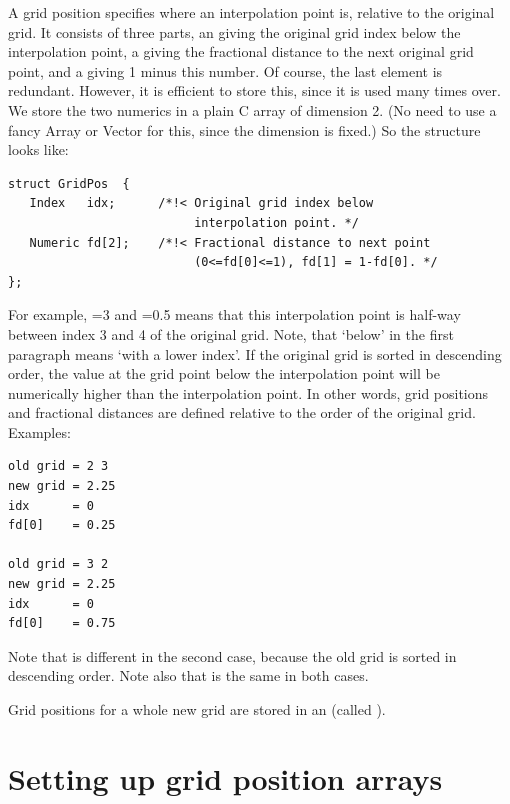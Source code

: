 A grid position specifies where an interpolation point is, relative
to the original grid. It consists of three parts, an  giving the
original grid index below the interpolation point, a 
giving the fractional distance to the next original grid point, and a
 giving 1 minus this number. Of course, the last element is
redundant. However, it is efficient to store this, since it is used
many times over. We store the two numerics in a plain C array of
dimension 2. (No need to use a fancy Array or Vector for this, since
the dimension is fixed.) So the structure  looks like:

\begin{verbatim}
struct GridPos  {
   Index   idx;      /*!< Original grid index below
                          interpolation point. */
   Numeric fd[2];    /*!< Fractional distance to next point
                          (0<=fd[0]<=1), fd[1] = 1-fd[0]. */ 
};
\end{verbatim}

For example, =3 and =0.5 means that this interpolation point is
half-way between index 3 and 4 of the original grid.  Note, that
`below' in the first paragraph means `with a lower index'. If the
original grid is sorted in descending order, the value at the grid
point below the interpolation point will be numerically higher than
the interpolation point.  In other words, grid positions and
fractional distances are defined relative to the order of the original
grid. Examples:

{\small
\begin{verbatim}
old grid = 2 3
new grid = 2.25
idx      = 0
fd[0]    = 0.25

old grid = 3 2
new grid = 2.25
idx      = 0
fd[0]    = 0.75
\end{verbatim}
}

Note that  is different in the second case, because the old grid
is sorted in descending order. Note also that  is the same in
both cases.

Grid positions for a whole new grid are stored in an 
(called ). 

\section{Setting up grid position arrays}

